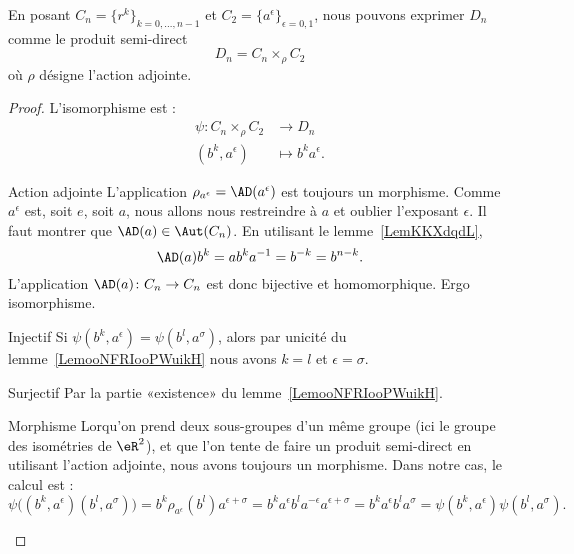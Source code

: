 \begin{proposition}
	En posant \( C_n=\{ r^k \}_{k=0,\ldots, n-1}\) et \( C_2=\{ a^{\epsilon} \}_{\epsilon=0,1}\), nous pouvons exprimer \( D_n\) comme le produit semi-direct
	\begin{equation}
		D_n=C_n\times_{\rho}C_2
	\end{equation}
	où \( \rho\) désigne l'action adjointe.
\end{proposition}

\begin{proof}
	L'isomorphisme est :
	\begin{equation}
		\begin{aligned}
			\psi\colon C_n\times_{\rho}C_2 & \to D_n                  \\
			(b^k,a^{\epsilon})             & \mapsto b^ka^{\epsilon}.
		\end{aligned}
	\end{equation}
	\begin{subproof}
		\item[Action adjointe]
		L'application \( \rho_{a^{\epsilon}}=\AD(a^{\epsilon})\) est toujours un morphisme. Comme \( a^{\epsilon}\) est, soit \( e\), soit \( a\), nous allons nous restreindre à \( a\) et oublier l'exposant \( \epsilon\). Il faut montrer que \( \AD(a)\in\Aut(C_n)\). En utilisant le lemme~\ref{LemKKXdqdL},
		\begin{equation}
			\AD(a)b^k=ab^ka^{-1}=b^{-k}=b^{n-k}.
		\end{equation}
		L'application \( \AD(a)\colon C_n\to C_n\) est donc bijective et homomorphique. Ergo isomorphisme.
		\item[Injectif]
		Si \( \psi(b^k,a^{\epsilon})=\psi(b^l,a^{\sigma})\), alors par unicité du lemme~\ref{LemooNFRIooPWuikH} nous avons \( k=l\) et \( \epsilon=\sigma\).
		\item[Surjectif]
		Par la partie «existence»  du lemme~\ref{LemooNFRIooPWuikH}.
		\item[Morphisme]
		Lorqu'on prend deux sous-groupes d'un même groupe (ici le groupe des isométries de \( \eR^2\)), et que l'on tente de faire un produit semi-direct en utilisant l'action adjointe, nous avons toujours un morphisme. Dans notre cas, le calcul est :
		\begin{equation}
			\psi\big( (b^k,a^{\epsilon})(b^l,a^{\sigma}) \big)=b^k\rho_{a^{\epsilon}}(b^l)a^{\epsilon+\sigma}=b^ka^{\epsilon}b^la^{-\epsilon}a^{\epsilon+\sigma}=b^ka^{\epsilon}b^la^{\sigma}=\psi(b^k,a^{\epsilon})\psi(b^l,a^{\sigma}).
		\end{equation}
	\end{subproof}
\end{proof}

